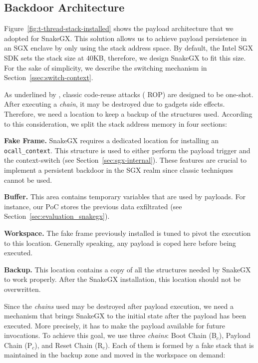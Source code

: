 \subsection{Backdoor Architecture}
\label{ssec:enclave-kit-architecture}

Figure~\ref{fig:t-thread-stack-installed} shows the payload
architecture that we adopted for SnakeGX.
This solution allows us to achieve payload persistence in an SGX enclave by 
only using the stack address space.
By default, the Intel SGX SDK sets the stack size at $40$KB, therefore, we 
design SnakeGX to fit this size.
For the sake of simplicity, we describe the switching mechanism in 
Section~\ref{ssec:switch-context}.

As underlined by \cite{vogl2014persistent}, classic code-reuse attacks (\eg 
ROP) are designed to be one-shot.
After executing a \emph{chain}, it may be destroyed due to gadgets side effects.
Therefore, we need a location to keep a backup of the structures used.
According to this consideration, we split the stack address memory in four 
sections:

\textbf{Fake Frame.} SnakeGX requires a dedicated location for installing 
an \texttt{ocall\_context}.
This structure is used to either perform the payload trigger and the 
context-switch (see Section~\ref{sec:sgx-internal}).
These features are crucial to implement a persistent backdoor in the SGX 
realm since classic techniques cannot be used.

\textbf{Buffer.} This area contains temporary variables that are used by  
payloads. For instance, our PoC stores the previous data 
exfiltrated (see Section~\ref{sec:evaluation_snakegx}).

\textbf{Workspace.} The fake frame previously installed is tuned to pivot the 
execution to this location. 
Generally speaking, any payload is coped here before being executed.

\textbf{Backup.} This location contains a copy of all the structures 
needed by SnakeGX to work properly.
After the SnakeGX installation, this location should not be overwritten.

Since the \emph{chains} used may be destroyed after 
payload execution, we need a mechanism that brings SnakeGX to the initial 
state after the payload has been executed.
More precisely, it has to make the payload available for future invocations.
To achieve this goal, we use three \emph{chains}: Boot Chain (B$_c$), Payload 
Chain (P$_c$), and Reset Chain (R$_c$).
Each of them is formed by a fake stack that is maintained in the backup zone 
and moved in the workspace on demand:

